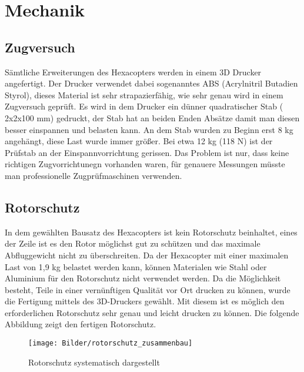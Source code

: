 \chapter{Mechanik}

\renewcommand{\kapitelautor}{Autor: Alexander Punz}

\section{Zugversuch}

Sämtliche Erweiterungen des Hexacopters werden in einem 3D Drucker angefertigt. Der Drucker verwendet dabei sogenanntes ABS (Acrylnitril Butadien Styrol), dieses Material ist sehr strapazierfähig, wie sehr genau wird in einem Zugversuch geprüft. 
Es wird in dem Drucker ein dünner quadratischer Stab ( 2x2x100 mm) gedruckt, der Stab hat an beiden Enden Absätze damit man diesen besser einspannen und belasten kann. An dem Stab wurden zu Beginn erst 8 kg angehängt, diese Last wurde immer größer.
Bei etwa 12 kg (118 N) ist der Prüfstab an der Einspannvorrichtung  gerissen. Das Problem ist nur, dass keine richtigen Zugvorrichtunegn vorhanden waren, für genauere Messungen müsste man professionelle Zugprüfmaschinen verwenden.

\section{Rotorschutz}
In dem gewählten Bausatz des Hexacopters ist kein Rotorschutz beinhaltet, eines der Zeile ist es den Rotor möglichst gut zu schützen und das maximale Abfluggewicht nicht zu überschreiten. Da der Hexacopter mit einer maximalen Last von 1,9 kg belastet werden kann, können Materialen wie Stahl oder Aluminium für den Rotorschutz nicht verwendet werden. 
Da die Möglichkeit besteht, Teile in einer vernünftigen Qualität vor Ort drucken zu können, wurde die Fertigung mittels des 3D-Druckers gewählt. Mit diesem ist es möglich den erforderlichen Rotorschutz sehr genau und leicht drucken zu können. 
Die folgende Abbildung zeigt den fertigen Rotorschutz.

\newpage

\begin{figure}[tbh]
\begin{centering}
\texttt{[image: Bilder/rotorschutz\_zusammenbau]}
\par\end{centering}
\caption{Rotorschutz systematisch dargestellt}
\label{Rotorschutz}
\end{figure}

